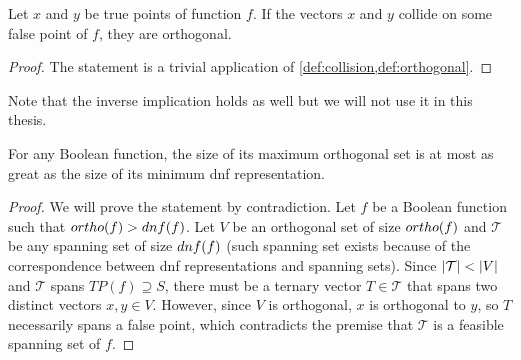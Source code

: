 \begin{theorem}
Let $x$ and $y$ be true points of function $f$.
If the vectors $x$ and $y$
collide on some false point of $f$,
they are orthogonal.
\end{theorem}

\begin{proof}
The statement is a trivial application of
\cref{def:collision,def:orthogonal}.
\end{proof}

Note that the inverse implication holds as well
\citep[Lemma 3.7]{Cepek2012}
but we will not use it in this thesis.

\begin{theorem}
[$\apply{ortho}{f} \leq \apply{dnf}{f}$
{\theoremsource[Observation 1.1]{Dubovsky2012}} %
{\theoremsource[Theorem 2.8, Corollary 3.2]{Cepek2012}}] %
\label{theorem:orthodnf}
For any Boolean function,
the size of its maximum orthogonal set
is at most as great
as the size of its minimum \acrshort{dnf} representation.
\end{theorem}

\begin{proof}
We will prove the statement by contradiction.
Let $f$ be a Boolean function such that
$ortho (f) > dnf (f)$.
Let $V$ be an orthogonal set of size $ortho (f)$
and $\mathcal{T}$ be any spanning set
of size $dnf (f)$
(such spanning set exists because of the correspondence
between \acrshort{dnf} representations and spanning sets).
Since $\lvert\mathcal{T}\rvert < \lvert V\rvert$
and $\mathcal{T}$ spans $TP(f) \supseteq S$,
there must be a ternary vector $T \in \mathcal{T}$
that spans
two distinct vectors $x, y \in V$.
However,
since $V$ is orthogonal,
$x$ is orthogonal to $y$,
so $T$ necessarily spans a false point,
which contradicts the premise that $\mathcal{T}$
is a feasible spanning set of $f$.
\end{proof}


